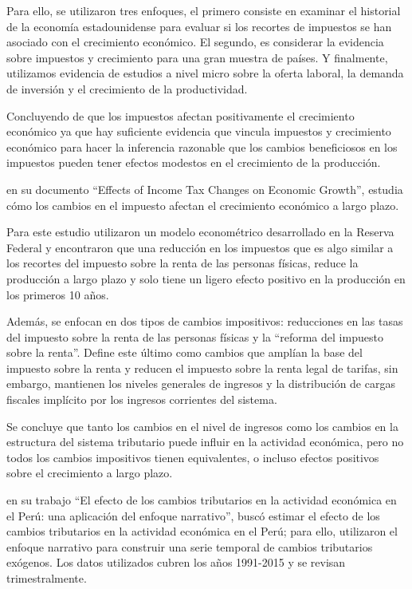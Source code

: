 \documentclass[
  letterpaper,
  DIV=11,
  numbers=noendperiod]{scrartcl}
\begin{document}
Para ello, se utilizaron tres enfoques, el primero consiste en examinar
el historial de la economía estadounidense para evaluar si los recortes
de impuestos se han asociado con el crecimiento económico. El segundo,
es considerar la evidencia sobre impuestos y crecimiento para una gran
muestra de países. Y finalmente, utilizamos evidencia de estudios a
nivel micro sobre la oferta laboral, la demanda de inversión y el
crecimiento de la productividad.

Concluyendo de que los impuestos afectan positivamente el crecimiento
económico ya que hay suficiente evidencia que vincula impuestos y
crecimiento económico para hacer la inferencia razonable que los cambios
beneficiosos en los impuestos pueden tener efectos modestos en el
crecimiento de la producción.

\textcite{gale_effects_2014} en su documento ``Effects of Income Tax
Changes on Economic Growth'', estudia cómo los cambios en el impuesto
afectan el crecimiento económico a largo plazo.

Para este estudio utilizaron un modelo econométrico desarrollado en la
Reserva Federal y encontraron que una reducción en los impuestos que es
algo similar a los recortes del impuesto sobre la renta de las personas
físicas, reduce la producción a largo plazo y solo tiene un ligero
efecto positivo en la producción en los primeros 10 años.

Además, se enfocan en dos tipos de cambios impositivos: reducciones en
las tasas del impuesto sobre la renta de las personas físicas y la
``reforma del impuesto sobre la renta''. Define este último como cambios
que amplían la base del impuesto sobre la renta y reducen el impuesto
sobre la renta legal de tarifas, sin embargo, mantienen los niveles
generales de ingresos y la distribución de cargas fiscales implícito por
los ingresos corrientes del sistema.

Se concluye que tanto los cambios en el nivel de ingresos como los
cambios en la estructura del sistema tributario puede influir en la
actividad económica, pero no todos los cambios impositivos tienen
equivalentes, o incluso efectos positivos sobre el crecimiento a largo
plazo.

\textcite{lahura_efecto_2018} en su trabajo ``El efecto de los cambios
tributarios en la actividad económica en el Perú: una aplicación del
enfoque narrativo'', buscó estimar el efecto de los cambios tributarios
en la actividad económica en el Perú; para ello, utilizaron el enfoque
narrativo para construir una serie temporal de cambios tributarios
exógenos. Los datos utilizados cubren los años 1991-2015 y se revisan
trimestralmente.
\end{document}
